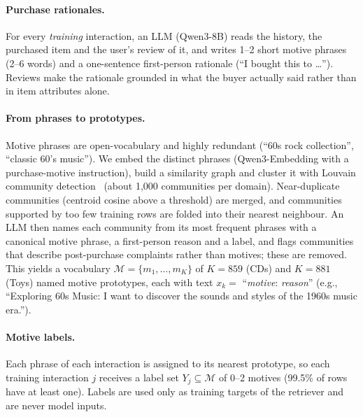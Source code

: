 \documentclass[10pt,twocolumn]{article}
\newcommand{\M}{\mathcal{M}}
\begin{document}
\paragraph{Purchase rationales.} For every \emph{training} interaction, an LLM (Qwen3-8B) reads the
history, the purchased item and the user's review of it, and writes 1--2 short motive phrases (2--6
words) and a one-sentence first-person rationale (``I bought this to \dots''). Reviews make the
rationale grounded in what the buyer actually said rather than in item attributes alone.

\paragraph{From phrases to prototypes.} Motive phrases are open-vocabulary and highly redundant
(``60s rock collection'', ``classic 60's music''). We embed the distinct phrases (Qwen3-Embedding with a
purchase-motive instruction), build a similarity graph and cluster it with Louvain community
detection~\citep{louvain} (about 1{,}000 communities per domain). Near-duplicate communities (centroid cosine
above a threshold) are merged, and communities supported by too few training rows are folded into their
nearest neighbour. An LLM then names each community from its most frequent phrases with a canonical
motive phrase, a first-person reason and a label, and flags communities that describe post-purchase
complaints rather than motives; these are removed. This yields a vocabulary
$\M=\{m_1,\dots,m_K\}$ of $K=859$ (CDs) and $K=881$ (Toys) named motive prototypes, each with text
$x_k=$ ``\emph{motive}: \emph{reason}'' (e.g., ``Exploring 60s Music: I want to discover the sounds and
styles of the 1960s music era.'').

\paragraph{Motive labels.} Each phrase of each interaction is assigned to its nearest prototype, so each
training interaction $j$ receives a label set $Y_j\subseteq\M$ of 0--2 motives (99.5\% of rows have at
least one). Labels are used only as training targets of the retriever and are never model inputs.
\end{document}

